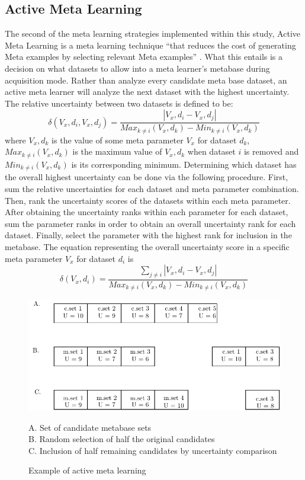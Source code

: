 \subsection{Active Meta Learning}
The second of the meta learning strategies implemented within this study, Active
Meta Learning is a meta learning technique  ``that reduces the cost of
generating Meta examples by selecting relevant Meta examples'' \cite{Bhatt}.
What this entails is a decision on what datasets to allow into a meta learner's
metabase during acquisition mode. Rather than analyze every candidate meta base
dataset, an active meta learner will analyze the next dataset with the highest
uncertainty. The relative uncertainty between two datasets is defined to be:
$$\delta(V_x,d_i,V_x,d_j) = \frac{|V_x,d_i - V_x,d_j|}{Max_{k\neq i}(V_x,d_k)- Min_{k\neq i}(V_x,d_k)}$$
where $V_x,d_k$ is the value of some meta parameter $V_x$ for dataset $d_k$,
$Max_{k\neq i}(V_x,d_k)$ is the maximum value of $V_x,d_k$ when dataset $i$ is
removed and $Min_{k\neq i}(V_x,d_k)$ is its corresponding minimum. Determining
which dataset has the overall highest uncertainty can be done via the following
procedure. First, sum the relative uncertainties for each dataset and
meta parameter combination. Then, rank the uncertainty scores of the datasets within
each meta parameter. After obtaining the uncertainty ranks within each parameter
for each dataset, sum the parameter ranks in order to obtain an overall
uncertainty rank for each dataset. Finally, select the parameter with the
highest rank for inclusion in the metabase. The equation representing the
overall uncertainty score in a specific meta parameter $V_x$ for dataset $d_i$ is
$$\delta(V_x,d_i) = \frac{\sum_{j\neq i} |V_x,d_i - V_x,d_j|}{Max_{k\neq i}(V_x,d_k)- Min_{k\neq i}(V_x,d_k)}$$
\begin{figure}[h]
\includegraphics{Chapters/Images/ActiveLearner/ActiveLearner.pdf}
\caption{Example of active meta learning}
\centering
\begin{flushleft}
A. Set of candidate metabase sets \\
B. Random selection of half the original candidates \\
C. Inclusion of half remaining candidates by uncertainty comparison \\
\end{flushleft}
\end{figure}
